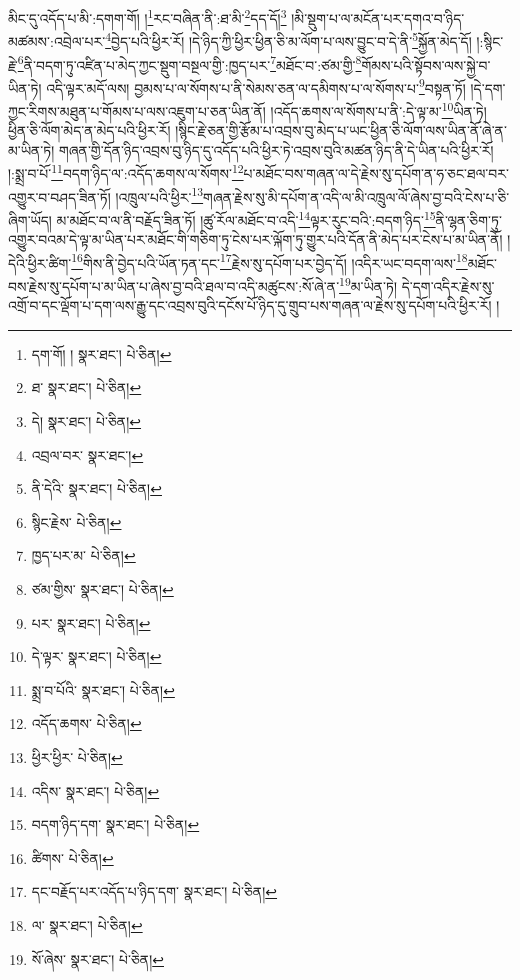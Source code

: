 མིང་དུ་འདོད་པ་མི་:དགག་གོ། །\footnote{དག་གོ། །  སྣར་ཐང་།  པེ་ཅིན། }རང་བཞིན་ནི་:ཐ་མི་\footnote{ཐ་  སྣར་ཐང་།  པེ་ཅིན། }དད་དོ།\footnote{དེ།  སྣར་ཐང་།  པེ་ཅིན། } །མི་སྡུག་པ་ལ་མངོན་པར་དགའ་བ་ཉིད་མཚམས་:འབྲེལ་པར་\footnote{འབྲལ་བར་  སྣར་ཐང་། }བྱེད་པའི་ཕྱིར་རོ། །དེ་ཉིད་ཀྱི་ཕྱིར་ཕྱིན་ཅི་མ་ལོག་པ་ལས་བྱུང་བ་དེ་ནི་\footnote{ནི་དེའི་  སྣར་ཐང་།  པེ་ཅིན། }སྐྱོན་མེད་དོ། །:སྙིང་རྗེ་\footnote{སྙིང་རྗེས་  པེ་ཅིན། }ནི་བདག་ཏུ་འཛིན་པ་མེད་ཀྱང་སྡུག་བསྔལ་གྱི་:ཁྱད་པར་\footnote{ཁྱད་པར་མ་  པེ་ཅིན། }མཐོང་བ་:ཙམ་གྱི་\footnote{ཙམ་གྱིས་  སྣར་ཐང་།  པེ་ཅིན། }གོམས་པའི་སྟོབས་ལས་སྐྱེ་བ་ཡིན་ཏེ། འདི་ལྟར་མདོ་ལས། བྱམས་པ་ལ་སོགས་པ་ནི་སེམས་ཅན་ལ་དམིགས་པ་ལ་སོགས་པ་\footnote{པར་  སྣར་ཐང་།  པེ་ཅིན། }བསྟན་ཏོ། །དེ་དག་ཀྱང་རིགས་མཐུན་པ་གོམས་པ་ལས་འཇུག་པ་ཅན་ཡིན་ནོ། །འདོད་ཆགས་ལ་སོགས་པ་ནི་:དེ་ལྟ་མ་\footnote{དེ་ལྟར་  སྣར་ཐང་།  པེ་ཅིན། }ཡིན་ཏེ། ཕྱིན་ཅི་ལོག་མེད་ན་མེད་པའི་ཕྱིར་རོ། །སྙིང་རྗེ་ཅན་གྱི་རྩོམ་པ་འབྲས་བུ་མེད་པ་ཡང་ཕྱིན་ཅི་ལོག་ལས་ཡིན་ནོ་ཞེ་ན་མ་ཡིན་ཏེ། གཞན་གྱི་དོན་ཉིད་འབྲས་བུ་ཉིད་དུ་འདོད་པའི་ཕྱིར་ཏེ་འབྲས་བུའི་མཚན་ཉིད་ནི་དེ་ཡིན་པའི་ཕྱིར་རོ། །:སྨྲ་བ་པོ་\footnote{སྨྲ་བ་པོའི་  སྣར་ཐང་།  པེ་ཅིན། }བདག་ཉིད་ལ་:འདོད་ཆགས་ལ་སོགས་\footnote{འདོད་ཆགས་  པེ་ཅིན། }པ་མཐོང་བས་གཞན་ལ་དེ་རྗེས་སུ་དཔོག་ན་ཧ་ཅང་ཐལ་བར་འགྱུར་བ་བཤད་ཟིན་ཏོ། །འཁྲུལ་པའི་ཕྱིར་\footnote{ཕྱིར་ཕྱིར་  པེ་ཅིན། }གཞན་རྗེས་སུ་མི་དཔོག་ན་འདི་ལ་མི་འཁྲུལ་ལོ་ཞེས་བྱ་བའི་ངེས་པ་ཅི་ཞིག་ཡོད། མ་མཐོང་བ་ལ་ནི་བརྗོད་ཟིན་ཏོ། །ཚུ་རོལ་མཐོང་བ་འདི་\footnote{འདིས་  སྣར་ཐང་།  པེ་ཅིན། }ལྟར་རུང་བའི་:བདག་ཉིད་\footnote{བདག་ཉིད་དག་  སྣར་ཐང་།  པེ་ཅིན། }ནི་ལྷན་ཅིག་ཏུ་འགྱུར་བའམ་དེ་ལྟ་མ་ཡིན་པར་མཐོང་གི་གཅིག་ཏུ་ངེས་པར་ལྐོག་ཏུ་གྱུར་པའི་དོན་ནི་མེད་པར་ངེས་པ་མ་ཡིན་ནོ། །དེའི་ཕྱིར་ཚིག་\footnote{ཚིགས་  པེ་ཅིན། }གིས་ནི་བྱེད་པའི་ཡོན་ཏན་དང་\footnote{དང་བརྗོད་པར་འདོད་པ་ཉིད་དག་  སྣར་ཐང་།  པེ་ཅིན། }རྗེས་སུ་དཔོག་པར་བྱེད་དོ། །འདིར་ཡང་བདག་ལས་\footnote{ལ་  སྣར་ཐང་།  པེ་ཅིན། }མཐོང་བས་རྗེས་སུ་དཔོག་པ་མ་ཡིན་པ་ཞེས་བྱ་བའི་ཐལ་བ་འདི་མཚུངས་:སོ་ཞེ་ན་\footnote{སོ་ཞེས་  སྣར་ཐང་།  པེ་ཅིན། }མ་ཡིན་ཏེ། དེ་དག་འདིར་རྗེས་སུ་འགྲོ་བ་དང་ལྡོག་པ་དག་ལས་རྒྱུ་དང་འབྲས་བུའི་དངོས་པོ་ཉིད་དུ་གྲུབ་པས་གཞན་ལ་རྗེས་སུ་དཔོག་པའི་ཕྱིར་རོ། །
